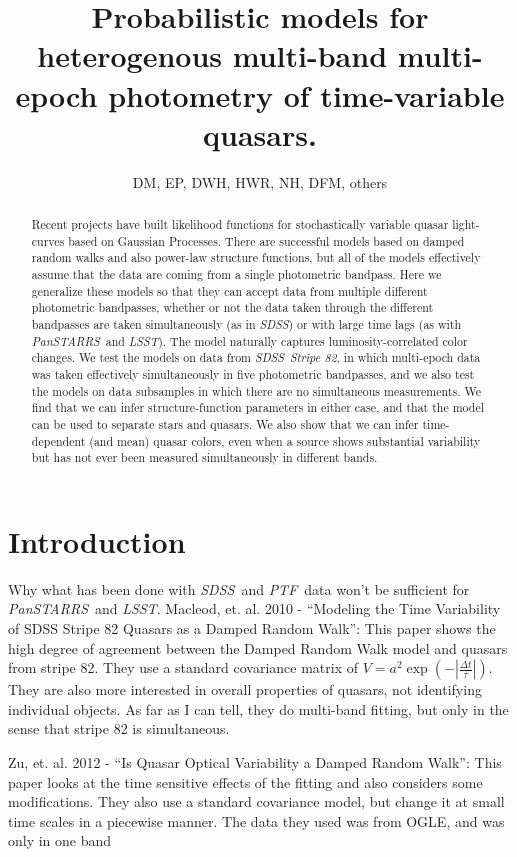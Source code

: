 \documentclass[letterpaper,12pt,preprint]{aastex}
\newcommand{\project}[1]{\textsl{#1}}
\newcommand{\sdss}{\project{SDSS}}
\newcommand{\lsst}{\project{LSST}}
\newcommand{\ptf}{\project{PTF}}
\newcommand{\panstarrs}{\project{PanSTARRS}}
\begin{document}
\title{Probabilistic models for heterogenous multi-band multi-epoch
  photometry of time-variable quasars.}
\author{DM, EP, DWH, HWR, NH, DFM, others}

\begin{abstract}
Recent projects have built likelihood functions for stochastically
variable quasar light-curves based on Gaussian Processes.  There are
successful models based on damped random walks and also power-law
structure functions, but all of the models effectively assume that the
data are coming from a single photometric bandpass.  Here we generalize
these models so that they can accept data from multiple different
photometric bandpasses, whether or not the data taken through the
different bandpasses are taken simultaneously (as in \sdss) or with
large time lags (as with \panstarrs\ and \lsst).  The model naturally
captures luminosity-correlated color changes.  We test the models on
data from \sdss\ \project{Stripe 82}, in which multi-epoch data was
taken effectively simultaneously in five photometric bandpasses, and
we also test the models on data subsamples in which there are no
simultaneous measurements.  We find that we can infer
structure-function parameters in either case, and that the model can
be used to separate stars and quasars.  We also show that we can infer
time-dependent (and mean) quasar colors, even when a source shows
substantial variability but has not ever been measured simultaneously
in different bands.
\end{abstract}


\section{Introduction}

Why what has been done with \sdss\ and \ptf\ data won't be sufficient
for \panstarrs\ and \lsst.
Macleod, et. al. 2010 - ``Modeling the Time Variability of SDSS Stripe 82 Quasars as a Damped Random Walk'':
This paper shows the high degree of agreement between the Damped Random Walk model and quasars from stripe 82. They use a standard covariance matrix of $V = a^2 \exp \left (-|\frac{\Delta t}{\tau}|\right)$. They are also more interested in overall properties of quasars, not identifying individual objects. As far as I can tell, they do multi-band fitting, but only in the sense that stripe 82 is simultaneous. 

Zu, et. al. 2012 - ``Is Quasar Optical Variability a Damped Random Walk'':
This paper looks at the time sensitive effects of the fitting and also considers some modifications. They also use a standard covariance model, but change it at small time scales in a piecewise manner. The data they used was from OGLE, and was only in one band
\end{document}
